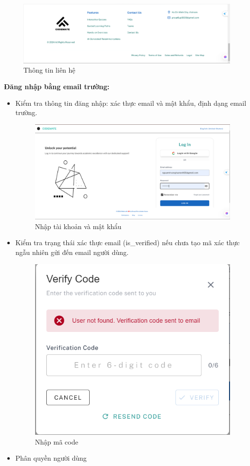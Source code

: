     \begin{figure}[H]
        \centering
        \includegraphics[width=0.8\linewidth]{images/introduction_contact.png}
        \caption{Thông tin liên hệ}
        \label{fig:enter-label}
    \end{figure}
\textbf{Đăng nhập bằng email trường:}
\begin{itemize}
    \item Kiểm tra thông tin đăng nhập: xác thực email và mật khẩu, định dạng email trường.
    \begin{figure}[H]
        \centering
        \includegraphics[width=0.8\linewidth]{images/login.png}
        \caption{Nhập tài khoản và mật khẩu}
        \label{fig:enter-label}
    \end{figure}
    \item Kiểm tra trạng thái xác thực email (is\_verified) nếu chưa tạo mã xác thực ngẫu nhiên gửi đến email người dùng.
    \begin{figure}[H]
        \centering
        \includegraphics[width=0.6\linewidth]{images/send_code.png}
        \caption{Nhập mã code}
        \label{fig:enter-label}
    \end{figure}
    
    \item Phân quyền người dùng
\end{itemize}
